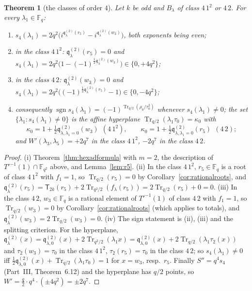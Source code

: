 \documentclass[12pt,a4paper]{amsart}
\newtheorem{theorem}{Theorem}[section]
\theoremstyle{definition}
\newcommand{\F}{\mathbb{F}}
\newcommand{\Tr}{\operatorname{Tr}}
\newcommand{\sgn}{\operatorname{sgn}}
\newcommand{\qq}{\mathfrak{q}}
\newcommand{\Spp}{S''}
\newcommand{\Tw}{\mathsf{T}}
\begin{document}
\begin{theorem}[the classes of order $4$]\label{thm:order4}
Let $k$ be odd and $B_\lambda$ of class $4\,1^2$ or $4\,2$. For every $\lambda_1\in\F_q$:
\begin{enumerate}[label=\textup{(\roman*)},leftmargin=2em]
\item $s_4(\lambda_1)=2q^2\bigl(i^{\qq^{(2)}_\lambda(r_5)}-i^{\qq^{(2)}_\lambda(w_3)}\bigr)$, both exponents being even;
\item in the class $4\,1^2$: $\qq^{(2)}_\lambda(r_5)=0$ and $s_4(\lambda_1)=2q^2\bigl(1-(-1)^{\frac12\qq^{(2)}_\lambda(w_3)}\bigr)\in\{0,+4q^2\}$;
\item in the class $4\,2$: $\qq^{(2)}_\lambda(w_3)=0$ and $s_4(\lambda_1)=2q^2\bigl((-1)^{\frac12\qq^{(2)}_\lambda(r_5)}-1\bigr)\in\{0,-4q^2\}$;
\item consequently $\sgn s_4(\lambda_1)=(-1)^{\Tr_{q/2}(\rho_0/\tau_0^2)}$ whenever $s_4(\lambda_1)\ne0$; the set $\{\lambda_1:s_4(\lambda_1)\ne0\}$ is the affine hyperplane $\Tr_{q/2}(\lambda_1\tau_0)=\kappa_0$ with
\[
\kappa_0=1+\tfrac12\qq^{(2)}_{\lambda,\lambda_1=0}(w_3)\ \ (4\,1^2),\qquad \kappa_0=1+\tfrac12\qq^{(2)}_{\lambda,\lambda_1=0}(r_5)\ \ (4\,2);
\]
and $W'(\lambda_3,\lambda_5)=+2q^7$ in the class $4\,1^2$, $-2q^7$ in the class $4\,2$.
\end{enumerate}
\end{theorem}
\begin{proof}
(i) Theorem~\ref{thm:hexadformula} with $m=2$, the description of $T'^{-1}(1)\cap\F_{q^2}$ above, and Lemma~\ref{lem:r5}. (ii) In the class $4\,1^2$, $r_5\in\F_q$ is a root of class $4\,1^2$ with $f_1=1$, so $\Tr_{q/2}(r_5)=0$ by Corollary~\ref{cor:rationalroots}, and $\qq^{(2)}_\lambda(r_5)=\Tw_{2k}(r_5)+2\Tr_{q^2/2}(f_\lambda(r_5))=2\Tr_{q/2}(r_5)+0=0$. (iii) In the class $4\,2$, $w_3\in\F_q$ is a rational element of $T'^{-1}(1)$ of class $4\,2$ with $f_1=1$, so $\Tr_{q/2}(w_3)=0$ by Corollary~\ref{cor:rationalroots} (which applies to totals), and $\qq^{(2)}_\lambda(w_3)=2\Tr_{q/2}(w_3)=0$. (iv) The sign statement is (ii), (iii) and the splitting criterion. For the hyperplane, $\qq^{(2)}_\lambda(x)=\qq^{(2)}_{\lambda,0}(x)+2\Tr_{q^2/2}(\lambda_1x)=\qq^{(2)}_{\lambda,0}(x)+2\Tr_{q/2}(\lambda_1\tau_2(x))$ and $\tau_2(w_3)=\tau_0$ in the class $4\,1^2$, $\tau_2(r_5)=\tau_0$ in the class $4\,2$; so $s_4(\lambda_1)\ne0$ iff $\frac12\qq^{(2)}_{\lambda,0}(x)+\Tr_{q/2}(\lambda_1\tau_0)=1$ for $x=w_3$, resp.\ $r_5$. Finally $\Spp=q^4s_4$ (Part~III, Theorem~6.12) and the hyperplane has $q/2$ points, so $W'=\frac q2\cdot q^4\cdot(\pm4q^2)=\pm2q^7$.
\end{proof}
\end{document}

